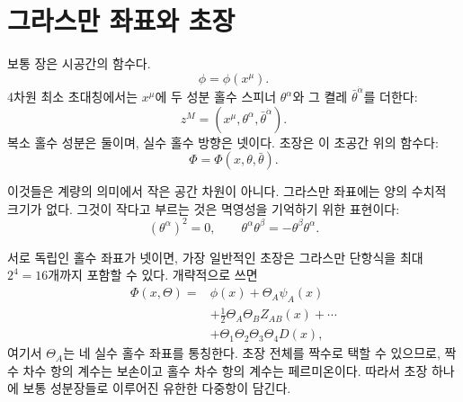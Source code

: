 \section{그라스만 좌표와 초장}

\begin{classroomqa}\end{classroomqa}

보통 장은 시공간의 함수다.
\begin{equation}
\phi=\phi(x^\mu).
\end{equation}
4차원 최소 초대칭에서는 \(x^\mu\)에 두 성분 홀수 스피너 \(\theta^\alpha\)와 그 켤레 \(\bar\theta^{\dot\alpha}\)를 더한다:
\begin{equation}
z^M=(x^\mu,\theta^\alpha,\bar\theta^{\dot\alpha}).
\end{equation}
복소 홀수 성분은 둘이며, 실수 홀수 방향은 넷이다. 초장은 이 초공간 위의 함수다:
\begin{equation}
\Phi=\Phi(x,\theta,\bar\theta).
\end{equation}

이것들은 계량의 의미에서 작은 공간 차원이 아니다. 그라스만 좌표에는 양의 수치적 크기가 없다. 그것이 작다고 부르는 것은 멱영성을 기억하기 위한 표현이다:
\begin{equation}
(\theta^\alpha)^2=0,
\qquad
\theta^\alpha\theta^\beta=-\theta^\beta\theta^\alpha.
\end{equation}

서로 독립인 홀수 좌표가 넷이면, 가장 일반적인 초장은 그라스만 단항식을 최대 \(2^4=16\)개까지 포함할 수 있다. 개략적으로 쓰면
\begin{equation}
\begin{aligned}
\Phi(x,\Theta)={}&\phi(x)+\Theta_A\psi_A(x)\\
&+\frac{1}{2}\Theta_A\Theta_B Z_{AB}(x)+\cdots\\
&+\Theta_1\Theta_2\Theta_3\Theta_4D(x),
\end{aligned}
\end{equation}
여기서 \(\Theta_A\)는 네 실수 홀수 좌표를 통칭한다. 초장 전체를 짝수로 택할 수 있으므로, 짝수 차수 항의 계수는 보손이고 홀수 차수 항의 계수는 페르미온이다. 따라서 초장 하나에 보통 성분장들로 이루어진 유한한 다중항이 담긴다.


